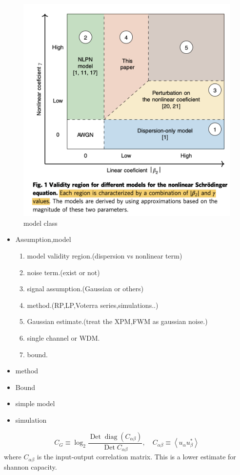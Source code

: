 \begin{figure}[ht]
\centering
\includegraphics[width=0.6\linewidth]{img/model_class.png}
\caption{model class\cite{2020_weak_dsp_nature}}
\label{model class}
\end{figure}
\begin{itemize}
\item Assumption,model
	\begin{enumerate}
	\item model validity region.(dispersion vs nonlinear term)
	\item noise term.(exist or not)
	\item signal assumption.(Gaussian or others)
	\item method.(RP,LP,Voterra series,simulations..)
	\item Gaussian estimate.(treat the XPM,FWM as gaussian noise.)
	\item single channel or WDM.
	\item bound.
	\end{enumerate}
\item method
\item Bound
\end{itemize}

\begin{itemize}
\item simple model
\item simulation
\end{itemize}

\begin{theorem}
$$
C_{G} \equiv \log _{2} \frac{\operatorname{Det} \operatorname{diag}\left(C_{\alpha \beta}\right)}{\operatorname{Det} C_{\alpha \beta}}, \quad C_{\alpha \beta} \equiv\left\langle u_{\alpha} u_{\beta}^{*}\right\rangle
$$
where $C_{\alpha\beta}$ is the input-output correlation matrix. This is a lower estimate for shannon capacity.
\end{theorem}

